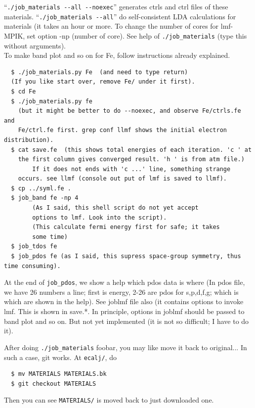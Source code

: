 \documentclass[a4paper,10pt,epsf,fleqn]{article}
\begin{document}
``\verb+./job_materials --all --noexec+'' generates ctrls and ctrl files of
these materials. ``\verb+./job_materials --all+'' do self-consistent
LDA calculations for materials (it takes an hour or more. To change the
number of cores for lmf-MPIK, set option -np (number of core). See
help of \verb+./job_materials+ (type this without arguments).\\

To make band plot and so on for Fe, follow instructions already explained.
\begin{verbatim}
  $ ./job_materials.py Fe  (and need to type return)
  (If you like start over, remove Fe/ under it first).
  $ cd Fe
  $ ./job_materials.py fe
    (but it might be better to do --noexec, and observe Fe/ctrls.fe and
	Fe/ctrl.fe first. grep conf llmf shows the initial electron distribution).
  $ cat save.fe  (this shows total energies of each iteration. 'c ' at
	the first column gives converged result. 'h ' is from atm file.)
        If it does not ends with 'c ...' line, something strange
	occurs. see llmf (console out put of lmf is saved to llmf).
  $ cp ../syml.fe .
  $ job_band fe -np 4 
        (As I said, this shell script do not yet accept
	    options to lmf. Look into the script).
        (This calculate fermi energy first for safe; it takes
	    some time)       
  $ job_tdos fe
  $ job_pdos fe (as I said, this supress space-group symmetry, thus time consuming).
\end{verbatim}
At the end of \verb+job_pdos+, we show a help which pdos data is where
(In pdos file, we have 26 numbers a line; first is energy, 2-26 are pdos
for s,p,d,f,g; which is which are shown in the help).
See joblmf file also (it contains options to invoke lmf. This is shown
in save.*. In principle, options in joblmf should be passed to band plot
and so on. But not yet implemented 
(it is not so difficult; I have to do it).

After doing \verb+./job_materials+ foobar, you may like move it back to
original... In such a case, git works. At \verb+ecalj/+, do
\begin{verbatim}
  $ mv MATERIALS MATERIALS.bk
  $ git checkout MATERIALS
\end{verbatim}
Then you can see \verb+MATERIALS/+ is moved back to just downloaded one.



\end{document}

